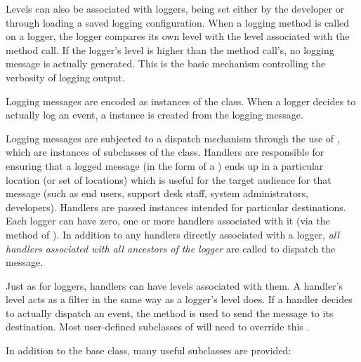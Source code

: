 Levels can also be associated with loggers, being set either by the
developer or through loading a saved logging configuration. When a
logging method is called on a logger, the logger compares its own
level with the level associated with the method call. If the logger's
level is higher than the method call's, no logging message is actually
generated. This is the basic mechanism controlling the verbosity of
logging output.

Logging messages are encoded as instances of the  class.
When a logger decides to actually log an event, a 
instance is created from the logging message.

Logging messages are subjected to a dispatch mechanism through the
use of , which are instances of subclasses of the
 class. Handlers are responsible for ensuring that a logged
message (in the form of a ) ends up in a particular
location (or set of locations) which is useful for the target audience for
that message (such as end users, support desk staff, system administrators,
developers). Handlers are passed  instances intended for
particular destinations. Each logger can have zero, one or more handlers
associated with it (via the  method of ).
In addition to any handlers directly associated with a logger,
\emph{all handlers associated with all ancestors of the logger} are
called to dispatch the message.

Just as for loggers, handlers can have levels associated with them.
A handler's level acts as a filter in the same way as a logger's level does.
If a handler decides to actually dispatch an event, the  method
is used to send the message to its destination. Most user-defined subclasses
of  will need to override this .

In addition to the base  class, many useful subclasses
are provided:

